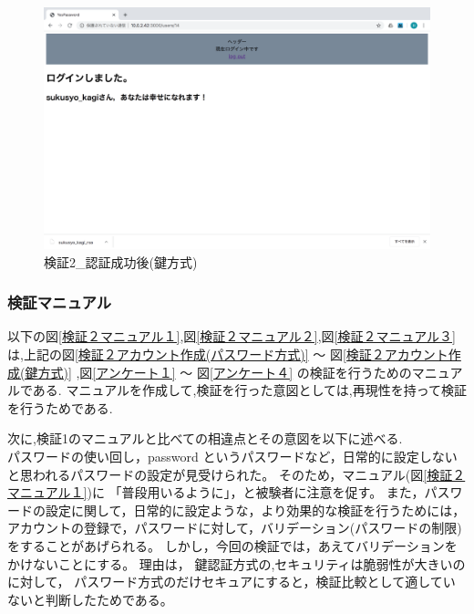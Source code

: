     \vspace{4cm}%
    \begin{figure}[H]
        \includegraphics[width=15cm]{./fig/chapter4/inspect_2/key_screnn/login-after2.png}
        \caption{検証2\_認証成功後(鍵方式)}
        \label{検証２認証成功後(鍵方式)}
    \end{figure}









   
    \newpage


    \subsubsection{検証マニュアル}
    以下の図\ref{検証２マニュアル１},図\ref{検証２マニュアル２},図\ref{検証２マニュアル３}は,上記の図\ref{検証２アカウント作成(パスワード方式)} 〜 図\ref{検証２アカウント作成(鍵方式)} ,図\ref{アンケート１} 〜 図\ref{アンケート４}
    の検証を行うためのマニュアルである.
    マニュアルを作成して,検証を行った意図としては,再現性を持って検証を行うためである.

    次に,検証1のマニュアルと比べての相違点とその意図を以下に述べる.\\
    パスワードの使い回し，password というパスワードなど，日常的に設定しないと思われるパスワードの設定が見受けられた。
    そのため，マニュアル(図\ref{検証２マニュアル１})に 「普段用いるように」，と被験者に注意を促す。
    また，パスワードの設定に関して，日常的に設定ような，より効果的な検証を行うためには，
    アカウントの登録で，パスワードに対して，バリデーション(パスワードの制限)をすることがあげられる。
    しかし，今回の検証では，あえてバリデーションをかけないことにする。
    理由は，
        鍵認証方式の,セキュリティは脆弱性が大きいのに対して，
        パスワード方式のだけセキュアにすると，検証比較として適していないと判断したためである。

